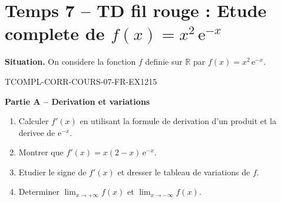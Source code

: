 

\section*{Temps 7 -- TD fil rouge : Etude complete de $f(x) = x^2\,\mathrm{e}^{-x}$}

\textbf{Situation.} On considere la fonction $f$ definie sur $\mathbb{R}$ par $f(x) = x^2\,\mathrm{e}^{-x}$.

\bigskip


\begin{exercice}{TCOMPL-CORR-COURS-07-FR-EX1}{2}{15}

\textbf{Partie A -- Derivation et variations}

\begin{enumerate}
  \item Calculer $f'(x)$ en utilisant la formule de derivation d'un produit et la derivee de $\mathrm{e}^{-x}$.
  \item Montrer que $f'(x) = x(2-x)\,\mathrm{e}^{-x}$.
  \item Etudier le signe de $f'(x)$ et dresser le tableau de variations de $f$.
  \item Determiner $\lim_{x \to +\infty} f(x)$ et $\lim_{x \to -\infty} f(x)$.
\end{enumerate}

\end{exercice}

